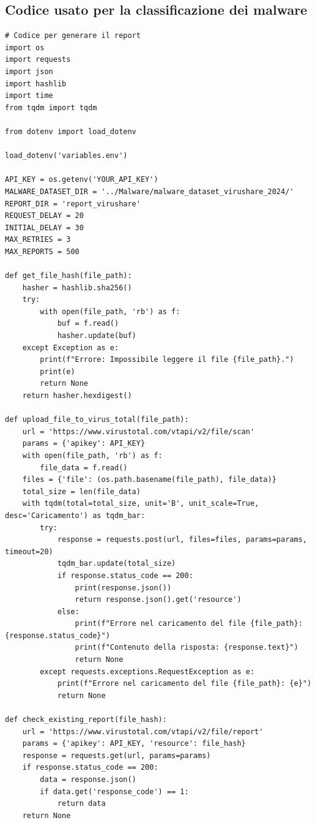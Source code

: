 \subsection{Codice usato per la classificazione dei malware}
\begin{lstlisting}[caption={Codice Python per la generazione del report in formato JSON da VirusTotal},captionpos=b]
# Codice per generare il report
import os
import requests
import json
import hashlib
import time
from tqdm import tqdm

from dotenv import load_dotenv

load_dotenv('variables.env')

API_KEY = os.getenv('YOUR_API_KEY')
MALWARE_DATASET_DIR = '../Malware/malware_dataset_virushare_2024/'
REPORT_DIR = 'report_virushare'
REQUEST_DELAY = 20  
INITIAL_DELAY = 30  
MAX_RETRIES = 3  
MAX_REPORTS = 500  

def get_file_hash(file_path):
    hasher = hashlib.sha256()
    try:
        with open(file_path, 'rb') as f:
            buf = f.read()
            hasher.update(buf)
    except Exception as e:
        print(f"Errore: Impossibile leggere il file {file_path}.")
        print(e)
        return None
    return hasher.hexdigest()

def upload_file_to_virus_total(file_path):
    url = 'https://www.virustotal.com/vtapi/v2/file/scan'
    params = {'apikey': API_KEY}
    with open(file_path, 'rb') as f:
        file_data = f.read()
    files = {'file': (os.path.basename(file_path), file_data)}
    total_size = len(file_data)
    with tqdm(total=total_size, unit='B', unit_scale=True, desc='Caricamento') as tqdm_bar:
        try:
            response = requests.post(url, files=files, params=params, timeout=20)
            tqdm_bar.update(total_size)
            if response.status_code == 200:
                print(response.json())
                return response.json().get('resource')
            else:
                print(f"Errore nel caricamento del file {file_path}: {response.status_code}")
                print(f"Contenuto della risposta: {response.text}")
                return None
        except requests.exceptions.RequestException as e:
            print(f"Errore nel caricamento del file {file_path}: {e}")
            return None

def check_existing_report(file_hash):
    url = 'https://www.virustotal.com/vtapi/v2/file/report'
    params = {'apikey': API_KEY, 'resource': file_hash}
    response = requests.get(url, params=params)
    if response.status_code == 200:
        data = response.json()
        if data.get('response_code') == 1:  
            return data
    return None


\end{lstlisting}
